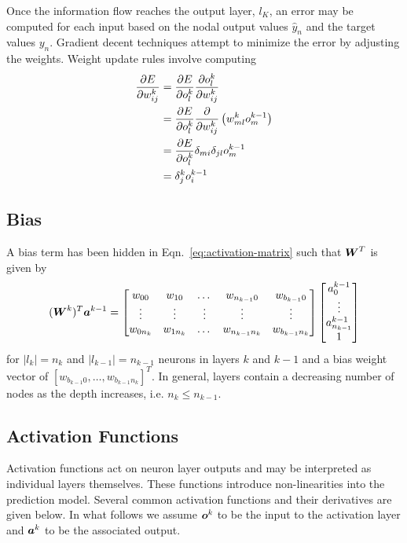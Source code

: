 \documentclass[12pt,notitlepage]{article}
\begin{document}
Once the information flow reaches the output layer, $l_{K}$, an error
may be computed for each input based on the nodal output values
$\hat{y}_{n}$ and the target values $y_{n}$.  Gradient decent
techniques attempt to minimize the error by adjusting the weights.
Weight update rules involve computing
\begin{equation}
  \label{eq:error-grad}
  \begin{split}
    \frac{\partial E}{\partial w^{k}_{ij}} &=
    \frac{\partial E}{\partial o_{l}^{k}}\frac{\partial o_{l}^{k}}{\partial w_{ij}^{k}}\\
    &= \frac{\partial E}{\partial o_{l}^{k}} \frac{\partial }{\partial w_{ij}^{k}}\left( w_{ml}^{k}o^{k-1}_{m} \right)\\
    &= \frac{\partial E}{\partial o_{l}^{k}}\delta_{mi}\delta_{jl}o_{m}^{k-1}\\
    &= \delta_{j}^{k}o_{i}^{k-1}
  \end{split}
\end{equation}

\subsection{Bias}
\label{sec:bias}
A bias term has been hidden in Eqn.~\ref{eq:activation-matrix} such
that $\boldsymbol{W}^{T}$ is given by
\begin{equation}
  \label{eq:wmat-explicit}
  (\boldsymbol{W}^{k})^{T}\boldsymbol{a}^{k-1} =
  \begin{bmatrix}
    w_{00} & w_{10} & \dots & w_{n_{k-1}0} & w_{b_{k-1}0} \\
    \vdots & \vdots & \vdots & \vdots & \vdots \\
    w_{0n_{k}} & w_{1n_{k}} & \dots & w_{n_{k-1}n_{k}} & w_{b_{k-1}n_{k}}
  \end{bmatrix}
  \begin{bmatrix}
    a_{0}^{k-1}\\
    \vdots\\
    a_{n_{k-1}}^{k-1}\\
    1
  \end{bmatrix}
\end{equation}
for $|l_{k}|=n_{k}$ and $|l_{k-1}|=n_{k-1}$ neurons in layers $k$ and $k-1$ and a bias
weight vector of $[w_{b_{k-1}0},\dots,w_{b_{k-1}n_{k}}]^{T}$.  In
general, layers contain a decreasing number of nodes as the depth
increases, i.e. $n_{k} \le n_{k-1}$.

\subsection{Activation Functions}
\label{sec:activation-fun}
Activation functions act on neuron layer outputs and may be interpreted as
individual layers themselves.  These functions introduce
non-linearities into the prediction model.  Several common activation
functions and their derivatives are given below.  In what follows we
assume $\boldsymbol{o}^{k}$ to be the input to the activation layer and
$\boldsymbol{a}^{k}$ to be the associated output.
\end{document}
